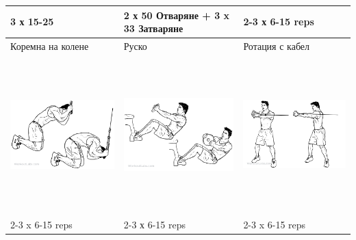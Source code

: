 \documentclass{article}
\begin{document}
\begin{tabular}{ | m{5cm} | m{5cm} | m{5cm} | }
3 х 15-25  &  2 х 50 Отваряне + 3 x 33 Затваряне & 2-3 х 6-15 reps \\ 
\hline
 Коремна на колене & Руско & Ротация с кабел \\ 
\begin{minipage}{5cm} \includegraphics[width=\linewidth, height=60mm]{Kneeling_Cable_Crunch.png} \end{minipage} &
\begin{minipage}{5cm} \includegraphics[width=\linewidth, height=60mm]{Russian_Twist.png} \end{minipage} & 
\begin{minipage}{5cm} \includegraphics[width=\linewidth, height=60mm]{Cable_Core_Rotation.png} \end{minipage} \\
2-3 x 6-15 reps & 2-3 х 6-15 reps & 2-3 x 6-15 reps \\ 
\hline
\end{tabular}
\end{document}
